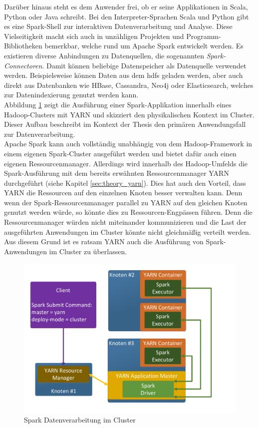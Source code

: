 \noindent
Darüber hinaus steht es dem Anwender frei, ob er seine Applikationen in Scala, Python oder Java schreibt. Bei den Interpreter-Sprachen Scala und Python gibt es eine Spark-Shell zur interaktiven Datenverarbeitung und Analyse. Diese Vielseitigkeit macht sich auch in unzähligen Projekten und Programm-Bibliotheken bemerkbar, welche rund um Apache Spark entwickelt werden.
Es existieren diverse Anbindungen zu Datenquellen, die sogenannten \textit{Spark-Connectoren}. Damit können beliebige Datenspeicher als Datenquelle verwendet werden.
Beispielsweise können Daten aus dem \gls{hdfs} geladen werden, aber auch direkt aus Datenbanken wie HBase, Cassandra, Neo4j oder Elasticsearch, welches zur Datenindexierung genutzt werden kann.  \\

\noindent
Abbildung \ref{fig:spark_cluster_architecture} zeigt die Ausführung einer Spark-Applikation innerhalb eines Hadoop-Clusters mit YARN und skizziert den physikalischen Kontext im Cluster. Dieser Aufbau beschreibt im Kontext der Thesis den primären Anwendungsfall zur Datenverarbeitung.\\ 
Apache Spark kann auch vollständig unabhängig von dem Hadoop-Framework in einem eigenen Spark-Cluster ausgeführt werden und bietet dafür auch einen eigenen Ressourcenmanager. Allerdings wird innerhalb des Hadoop-Umfelds die Spark-Ausführung mit dem bereits erwähnten Ressourcenmanager YARN durchgeführt (siehe Kapitel \ref{sec:theory_yarn}). Dies hat auch
den Vorteil, dass YARN die Ressourcen auf den einzelnen Knoten besser verwalten kann. Denn wenn der Spark-Ressourcenmanager parallel zu YARN auf den gleichen Knoten genutzt werden würde, so könnte dies zu Ressourcen-Engpässen führen. Denn die Ressourcenmanager würden nicht miteinander kommunizieren und die Last der ausgeführten Anwendungen im Cluster könnte nicht gleichmäßig verteilt werden. Aus diesem Grund ist es ratsam YARN auch die Ausführung von Spark-Anwendungen im Cluster zu überlassen.\\

\begin{figure}[ht]
  \centering
  \includegraphics[width=\textwidth]{./resource/spark_cluster_architecture.pdf}
  \caption{Spark Datenverarbeitung im Cluster}
  \label{fig:spark_cluster_architecture}
\end{figure}

